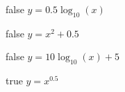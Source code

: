 			\begin{reponses}
				\item[false] $y = \num{0.5}\log_{10}(x)$
					\item[false] $y = x^2+\num{0.5}$
					\item[false] $y = \num{10}\log_{10}(x) + 5$
					\item[true] $y = x^{\num{0.5}}$
			\end{reponses}
